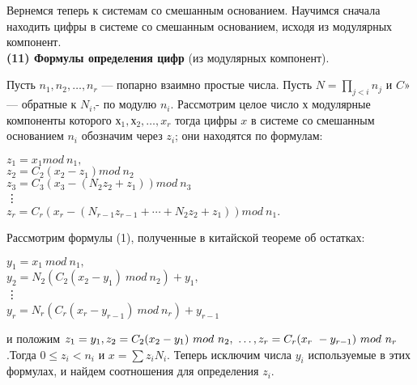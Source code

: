 \pagebreak
\newpage

Вернемся теперь к системам со смешанным основанием. Научимся
сначала находить цифры в системе со смешанным основанием, исходя
из модулярных компонент.\\
\textbf{(11) Формулы определения цифр} (из модулярных компонент).\par
 Пусть $n_1,n_2,\ldots, n_r$ — попарно взаимно простые числа. Пусть
$N = \prod_{j<i} n_{j}$ и $C$» — обратные к $N_{i}$,- по модулю $n_{i}$. Рассмотрим целое число $х$ модулярные компоненты которого $х_{1},х_{2},\ldots, x_{r}$ тогда цифры $x$ в системе со смешанным основанием $n_{i}$ обозначим через $z_i$; они находятся по формулам:
\begin{flushleft}
\hspace{72pt}$z_{1} = x_{1} mod\ n_1,$ \\
\hspace{72pt}$z_{2} = C_{2}(x_{2} - z_{1}) mod\ n_{2}$ \\
\hspace{72pt}$z_{3} = C_{3}(x_{3} - (N_{2}z_{2} + z_{1}))mod\ n_{3}$ \\
\hspace{85pt}\vdots  \\
\hspace{72pt}$z_{r} = C_{r}(x_{r} - (N_{r-1}z_{r-1}+\cdots+N_{2}z_{2}+z_{1}))mod\ n_{1}.$
\end{flushleft}
\begin{myproof}
Рассмотрим формулы (1), полученные в китайской теореме об остатках:
\begin{flushleft}
\hspace{72pt}$y_{1} = x_{1}\ mod\ n_{1},$  \\
\hspace{72pt}$y_{2} = N_{2}(C_{2}(x_{2}-y_{1})\ mod\ n_{2})+ y_{1},$  \\
\hspace{85pt}\vdots \\
\hspace{72pt}$y_{r} = N_{r}(C_{r}(x_{r}-y_{r-1})\ mod\ n_{r})+y_{r-1}$ \\
\end{flushleft}
и положим $z_{1} = y_{1}, z_{2} = C_{2}(x_{2} - y_{1})\ mod\ n_{2},\ \ldots, z_r = C_{r}(x_{r}\ -\linebreak y_{r-1})\ mod\ n_{r} $.Тогда $0 \leq z_{i} < n_{i}$ и $x =\sum z_{i}N_{i}$. Теперь исключим числа $y_{i}$ используемые в этих формулах, и найдем соотношения\linebreak
для определения $z_{i}$.
\end{myproof}
